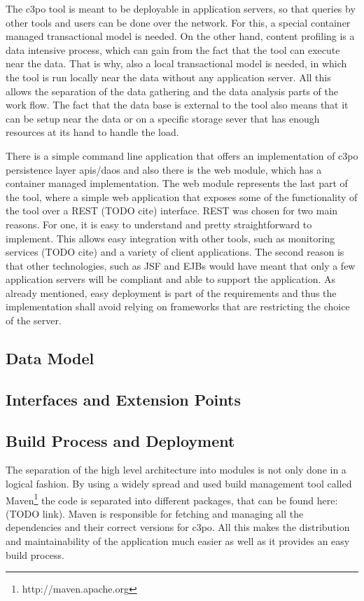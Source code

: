 The c3po tool is meant to be deployable in application servers, so that queries by other tools and users can be done over the network. For this, a special container managed transactional model is needed. On the other hand, content profiling is a data intensive process, which can gain from the fact that the tool can execute near the data. That is why, also a local transactional model is needed, in which the tool is run locally near the data without any application server. All this allows the separation of the data gathering and the data analysis parts of the work flow. The fact that the data base is external to the tool also means that it can be setup near the data or on a specific storage sever that has enough resources at its hand to handle the load.

There is a simple command line application that offers an implementation of c3po persistence layer apis/daos and also there is the web module, which has a container managed implementation. The web module represents the last part of the tool, where a simple web application that exposes some of the functionality of the tool over a REST (TODO cite) interface. REST was chosen for two main reasons. For one, it is easy to understand and pretty straightforward to implement. This allows easy integration with other tools, such as monitoring services (TODO cite) and a variety of client applications. The second reason is that other technologies, such as JSF and EJBs would have meant that only a few application servers will be compliant and able to support the application. As already mentioned, easy deployment is part of the requirements and thus the implementation shall avoid relying on frameworks that are restricting the choice of the server.

\subsection{Data Model}

\subsection{Interfaces and Extension Points}

\subsection{Build Process and Deployment}
The separation of the high level architecture into modules is not only done in a logical fashion. By using a widely spread and used build management tool called Maven\footnote{http://maven.apache.org} the code is separated into different packages, that can be found here: (TODO link). Maven is responsible for fetching and managing all the dependencies and their correct versions for c3po.
All this makes the distribution and maintainability of the application much easier as well as it provides an easy build process.

